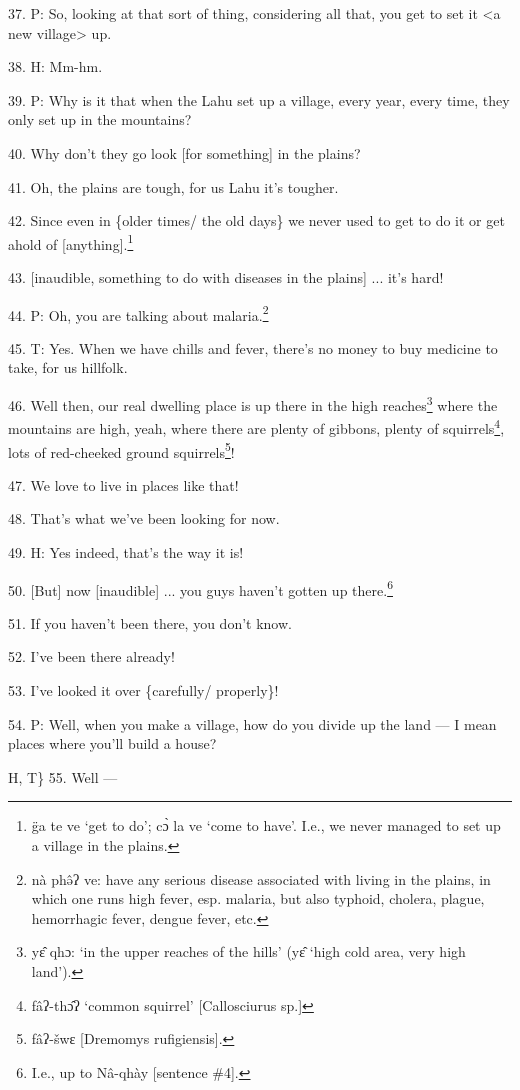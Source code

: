 37. P: So, looking at that sort of thing, considering all that, you get to set
it <a new village> up.

38. H: Mm-hm.

39. P: Why is it that when the Lahu set up a village, every year, every time, they
only set up in the mountains?

40. Why don't they go look [for something] in the plains?

41. Oh, the plains are tough, for us Lahu it's tougher.

42. Since even in \{older times/ the old days\} we never used to get to do it or
get ahold of [anything].\footnote{g̈a te ve `get to do'; cɔ̀ la ve `come to have'. I.e., we never managed to set up a village in the plains.}

43. [inaudible, something to do with diseases in the plains] ... it's hard!

44. P: Oh, you are talking about malaria.\footnote{nà phə̂ʔ ve: have any serious disease associated with living in the plains, in which one runs high fever, esp. malaria, but also typhoid, cholera, plague, hemorrhagic fever, dengue fever, etc.}

45. T: Yes. When we have chills and fever, there's no money to buy medicine to
take, for us hillfolk.

46. Well then, our real dwelling place is up there in the high reaches\footnote{yɛ̂ qhɔ: `in the upper reaches of the hills' (yɛ̂ `high cold area, very high land').} where
the mountains are high, yeah, where there are plenty of gibbons, plenty of squirrels\footnote{fâʔ-thɔ̂ʔ `common squirrel' [Callosciurus sp.]},
lots of red-cheeked ground squirrels\footnote{fâʔ-šwɛ [Dremomys rufigiensis].}!

47. We love to live in places like that!

48. That's what we've been looking for now.

49. H: Yes indeed, that's the way it is!

50. [But] now [inaudible] ... you guys haven't gotten up there.\footnote{I.e., up to Nâ-qhày [sentence \#4].}

51. If you haven't been there, you don't know.

52. I've been there already!

53. I've looked it over \{carefully/ properly\}!

54. P: Well, when you make a village, how do you divide up the land --- I mean
places where you'll build a house?

H, T\} 55. Well ---

